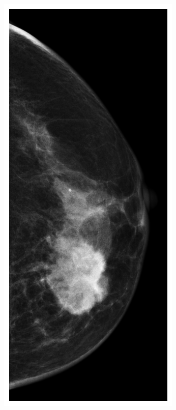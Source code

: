 \documentclass[a4paper,10pt]{book}
\begin{document}
\begin{figure}[h!]
\begin{subfigure}[t]{0.15\textwidth}
        \includegraphics[width=\textwidth]{reports//assets/preprocess_b.png}

\end{subfigure}
\end{figure}
\end{document}
